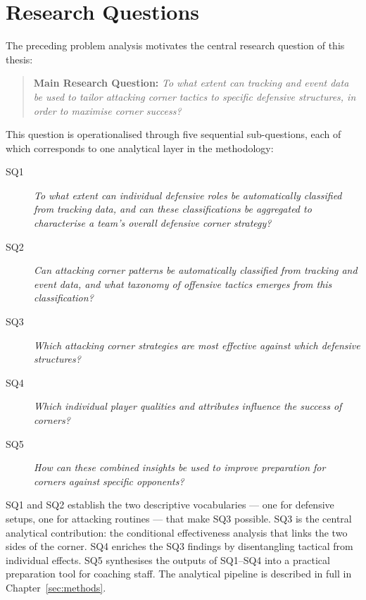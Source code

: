 \section{Research Questions}
\label{sec:research_questions}

The preceding problem analysis motivates the central research question of this
thesis:

\begin{quote}
  \textbf{Main Research Question:} \emph{To what extent can tracking and event
  data be used to tailor attacking corner tactics to specific defensive
  structures, in order to maximise corner success?}
\end{quote}

This question is operationalised through five sequential sub-questions, each
of which corresponds to one analytical layer in the methodology:

\begin{description}
  \item[SQ1] \emph{To what extent can individual defensive roles be automatically
    classified from tracking data, and can these classifications be aggregated
    to characterise a team's overall defensive corner strategy?}

  \item[SQ2] \emph{Can attacking corner patterns be automatically classified from
    tracking and event data, and what taxonomy of offensive tactics emerges from
    this classification?}

  \item[SQ3] \emph{Which attacking corner strategies are most effective against
    which defensive structures?}

  \item[SQ4] \emph{Which individual player qualities and attributes influence the
    success of corners?}

  \item[SQ5] \emph{How can these combined insights be used to improve preparation
    for corners against specific opponents?}
\end{description}

SQ1 and SQ2 establish the two descriptive vocabularies --- one for defensive
setups, one for attacking routines --- that make SQ3 possible. SQ3 is the
central analytical contribution: the conditional effectiveness analysis that
links the two sides of the corner. SQ4 enriches the SQ3 findings by
disentangling tactical from individual effects. SQ5 synthesises the outputs
of SQ1--SQ4 into a practical preparation tool for coaching staff. The analytical
pipeline is described in full in Chapter~\ref{sec:methods}.


